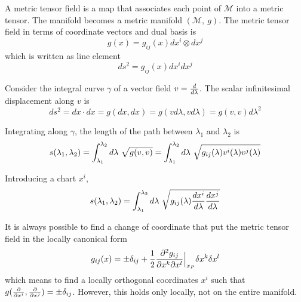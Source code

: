     A metric tensor field is a map that associates each point of $\mathcal M$ into a metric tensor. The manifold becomes a metric manifold $(\mathcal M, ~g)$. The metric tensor field in terms of coordinate vectors and dual basis is 
    \begin{equation*}
        g(x) = g_{ij}(x) dx^i \otimes dx^j
    \end{equation*}
    which is written as line element
    \begin{equation*}
        ds^2 = g_{ij}(x) dx^i dx^j
    \end{equation*}

    Consider the integral curve $\gamma$ of a vector field $v = \frac{d}{d\lambda}$. The scalar infinitesimal displacement along $v$ is 
    \begin{equation*}
        ds^2 = dx \cdot dx = g(dx, dx) = g(v d\lambda, v d\lambda) = g(v,v) d\lambda^2
    \end{equation*}

    Integrating along $\gamma$, the length of the path between $\lambda_1$ and $\lambda_2$ is 
    \begin{equation*}
        s(\lambda_1, \lambda_2) = \int_{\lambda_1}^{\lambda_2}d\lambda~ \sqrt{g(v,v)} = \int_{\lambda_1}^{\lambda_2}d\lambda~ \sqrt{g_{ij}(\lambda) v^i(\lambda) v^j(\lambda)}
    \end{equation*}

    Introducing a chart $x^i$, 
    \begin{equation*}
        s(\lambda_1, \lambda_2) = \int_{\lambda_1}^{\lambda_2}d\lambda~ \sqrt{g_{ij}(\lambda) \frac{dx^i}{d\lambda} \frac{dx^j}{d\lambda}}
    \end{equation*}


    It is always possible to find a change of coordinate that put the metric tensor field in the locally canonical form
    \begin{equation*}
        g_{ij} (x) = \pm \delta_{ij} + \frac{1}{2} \frac{\partial^2 g_{ij}}{\partial x^k \partial x^l} \Big\vert_{x_P} \delta x^k \delta x^l
    \end{equation*}
    which means to find a locally orthogonal coordinates $x^i$ such that $g(\frac{\partial}{\partial x^i}, \frac{\partial}{\partial x^j}) = \pm \delta_{ij}$. However, this holds only locally, not on the entire manifold.

